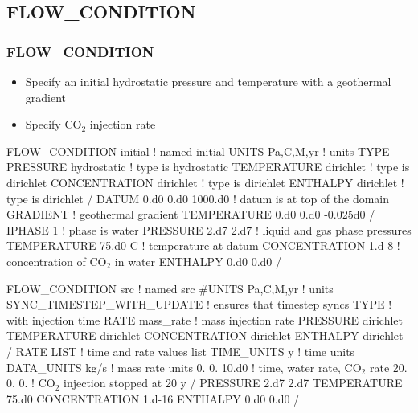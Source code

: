 \documentclass{beamer}
\def\co2{CO$_2$}
\newcommand\redcomment[1]{{{\color{red} #1}}}
\newcommand\bluecomment[1]{{{\color{blue} #1}}}
\newcommand\greencomment[1]{{{\color{green} #1}}}
\begin{document}
\subsection{FLOW\_CONDITION}

\begin{frame}\frametitle{FLOW\_CONDITION}

\begin{itemize}
\item Specify an initial hydrostatic pressure and temperature with a geothermal gradient
\item Specify \co2 injection rate
\end{itemize}

\begin{semiverbatim}
FLOW_CONDITION initial \bluecomment{! named \greencomment{initial}}
  UNITS Pa,C,M,yr \bluecomment{! units}
  TYPE
    PRESSURE hydrostatic    \bluecomment{! type is \redcomment{hydrostatic}}
    TEMPERATURE dirichlet   \bluecomment{! type is \redcomment{dirichlet}}
    CONCENTRATION dirichlet \bluecomment{! type is \redcomment{dirichlet}}
    ENTHALPY dirichlet      \bluecomment{! type is \redcomment{dirichlet}}
  /
  DATUM 0.d0 0.d0 1000.d0 \bluecomment{! datum is at top of the domain}
  GRADIENT                \bluecomment{! geothermal gradient}
    TEMPERATURE 0.d0 0.d0 -0.025d0
  /
  IPHASE 1            \bluecomment{! phase is water}
  PRESSURE 2.d7 2.d7  \bluecomment{! liquid and gas phase pressures}
  TEMPERATURE 75.d0 C \bluecomment{! temperature at datum}
  CONCENTRATION 1.d-8 \bluecomment{! concentration of \co2 in water}
  ENTHALPY 0.d0 0.d0
/

FLOW_CONDITION src  \bluecomment{! named \greencomment{src}}
  #UNITS Pa,C,M,yr \bluecomment{! units}
  SYNC_TIMESTEP_WITH_UPDATE \bluecomment{! ensures that timestep syncs}
  TYPE                      \bluecomment{! with injection time}
    RATE mass_rate          \bluecomment{! mass injection rate}
    PRESSURE dirichlet
    TEMPERATURE dirichlet
    CONCENTRATION dirichlet
    ENTHALPY dirichlet
  /
  RATE LIST                \bluecomment{! time and rate values list}
    TIME_UNITS y           \bluecomment{! time units}
    DATA_UNITS kg/s        \bluecomment{! mass rate units}
    0.  0. 10.d0           \bluecomment{! time, water rate, \co2 rate}
    20. 0. 0.              \bluecomment{! \co2 injection stopped at 20 y}
  /
  PRESSURE 2.d7 2.d7 
  TEMPERATURE 75.d0
  CONCENTRATION 1.d-16 
  ENTHALPY 0.d0 0.d0
/

\end{semiverbatim}

\end{frame}
\end{document}
